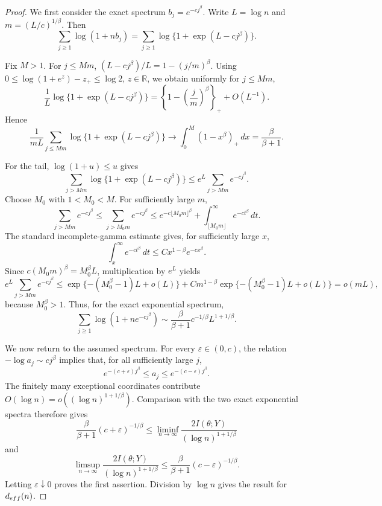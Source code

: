 \documentclass[10pt,a4paper]{amsart}
\begin{document}
\begin{proof}
	We first consider the exact spectrum \(b_j=e^{-cj^\beta}\). Write \(L=\log n\) and \(m=(L/c)^{1/\beta}\). Then
	\[
	\sum_{j\geq1}\log(1+nb_j)
	=
	\sum_{j\geq1}\log\{1+\exp(L-cj^\beta)\}.
	\]
	
	Fix \(M>1\). For \(j\leq Mm\), \((L-cj^\beta)/L=1-(j/m)^\beta\). Using \(0\leq\log(1+e^z)-z_+\leq\log2\), \(z\in\mathbb R\), we obtain uniformly for \(j\leq Mm\),
	\[
	\frac{1}{L}\log\{1+\exp(L-cj^\beta)\}
	=
	\left\{1-\left(\frac{j}{m}\right)^\beta\right\}_+
	+
	O(L^{-1}).
	\]
	Hence
	\[
	\frac{1}{mL}
	\sum_{j\leq Mm}\log\{1+\exp(L-cj^\beta)\}
	\longrightarrow
	\int_0^M(1-x^\beta)_+\,dx
	=
	\frac{\beta}{\beta+1}.
	\]
	
	For the tail, \(\log(1+u)\leq u\) gives
	\[
	\sum_{j>Mm}\log\{1+\exp(L-cj^\beta)\}
	\leq
	e^L\sum_{j>Mm}e^{-cj^\beta}.
	\]
	Choose \(M_0\) with \(1<M_0<M\). For sufficiently large \(m\),
	\[
	\sum_{j>Mm}e^{-cj^\beta}
	\leq
	\sum_{j>M_0m}e^{-cj^\beta}
	\leq
	e^{-c\lfloor M_0m\rfloor^\beta}
	+
	\int_{\lfloor M_0m\rfloor}^{\infty}e^{-ct^\beta}\,dt.
	\]
	The standard incomplete-gamma estimate gives, for sufficiently large \(x\),
	\[
	\int_x^\infty e^{-ct^\beta}\,dt
	\leq
	C x^{1-\beta}e^{-cx^\beta}.
	\]
	Since \(c(M_0m)^\beta=M_0^\beta L\), multiplication by \(e^L\) yields
	\[
	e^L\sum_{j>Mm}e^{-cj^\beta}
	\leq
	\exp\{-(M_0^\beta-1)L+o(L)\}
	+
	C m^{1-\beta}
	\exp\{-(M_0^\beta-1)L+o(L)\}
	=
	o(mL),
	\]
	because \(M_0^\beta>1\). Thus, for the exact exponential spectrum,
	\[
	\sum_{j\geq1}\log(1+ne^{-cj^\beta})
	\sim
	\frac{\beta}{\beta+1}c^{-1/\beta}L^{1+1/\beta}.
	\]
	
	We now return to the assumed spectrum. For every \(\varepsilon\in(0,c)\), the relation \(-\log a_j\sim cj^\beta\) implies that, for all sufficiently large \(j\),
	\[
	e^{-(c+\varepsilon)j^\beta}
	\leq
	a_j
	\leq
	e^{-(c-\varepsilon)j^\beta}.
	\]
	The finitely many exceptional coordinates contribute \(O(\log n)=o\!\left((\log n)^{1+1/\beta}\right)\). Comparison with the two exact exponential spectra therefore gives
	\[
	\frac{\beta}{\beta+1}(c+\varepsilon)^{-1/\beta}
	\leq
	\liminf_{n\to\infty}
	\frac{2I(\theta;Y)}{(\log n)^{1+1/\beta}}
	\]
	and
	\[
	\limsup_{n\to\infty}
	\frac{2I(\theta;Y)}{(\log n)^{1+1/\beta}}
	\leq
	\frac{\beta}{\beta+1}(c-\varepsilon)^{-1/\beta}.
	\]
	Letting \(\varepsilon\downarrow0\) proves the first assertion. Division by \(\log n\) gives the result for \(d_{\rm eff}(n)\).
\end{proof}
\end{document}
